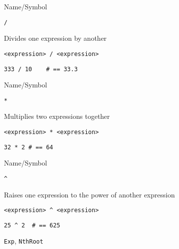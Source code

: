 \rl     


\begin{desc}{Name/Symbol}

\item[Name/Symbol] \verb+/+ 

\item[Description]  Divides one expression by another

\item[Usage]        \verb+<expression> / <expression>+ 

\item[Example]
\begin{verbatim}
333 / 10    # == 33.3
\end{verbatim}

\item[See Also]

\end{desc} 

\rl

\begin{desc}{Name/Symbol}
   

\item[Name/Symbol] \verb+*+

\item[Description]        Multiplies two expressions together

\item[Usage]       \verb+<expression> * <expression>+

\item[Example]
\begin{verbatim}
32 * 2 # == 64
\end{verbatim}

\item[See Also]     

\end{desc}

\rl


\begin{desc}{Name/Symbol}

\item[Name/Symbol] \verb!^!

\item[Description]  Raises one expression to the power of  another expression

\item[Usage]       \verb!<expression> ^ <expression>!

\item[Example]
\begin{verbatim}
25 ^ 2  # == 625
\end{verbatim}

\item[See Also]    \texttt{Exp}, \texttt{NthRoot}

\end{desc}

